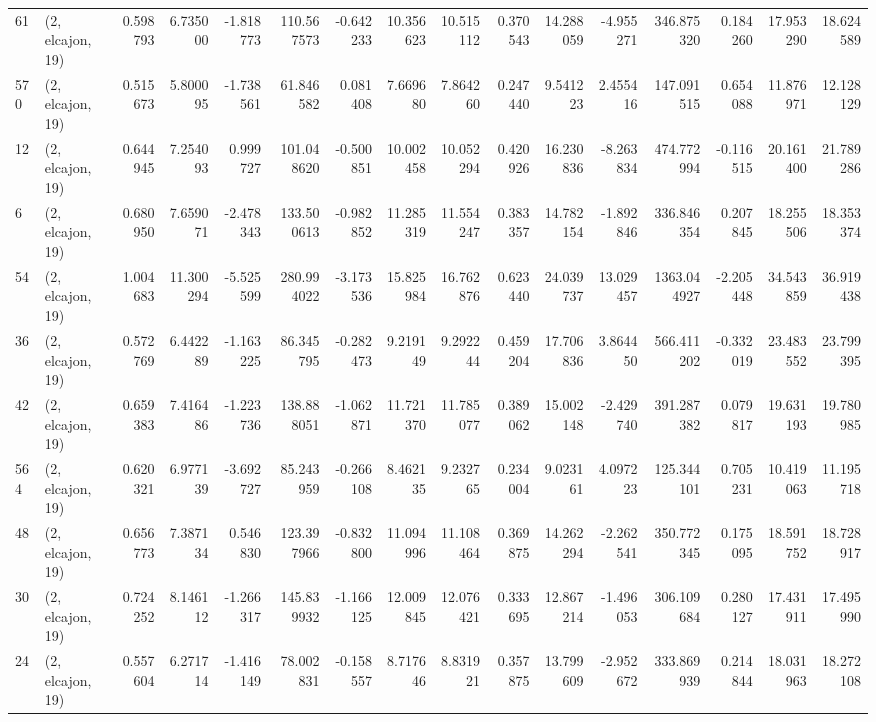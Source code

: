 \begin{tabular}{llrrrrrrrrrrrrrr}
61  &  (2, elcajon, 19) &   0.598793 &   6.735000 &  -1.818773 &   110.567573 &  -0.642233 &  10.356623 &  10.515112 &  0.370543 &  14.288059 &  -4.955271 &    346.875320 &   0.184260 &  17.953290 &   18.624589 \\
570 &  (2, elcajon, 19) &   0.515673 &   5.800095 &  -1.738561 &    61.846582 &   0.081408 &   7.669680 &   7.864260 &  0.247440 &   9.541223 &   2.455416 &    147.091515 &   0.654088 &  11.876971 &   12.128129 \\
12  &  (2, elcajon, 19) &   0.644945 &   7.254093 &   0.999727 &   101.048620 &  -0.500851 &  10.002458 &  10.052294 &  0.420926 &  16.230836 &  -8.263834 &    474.772994 &  -0.116515 &  20.161400 &   21.789286 \\
6   &  (2, elcajon, 19) &   0.680950 &   7.659071 &  -2.478343 &   133.500613 &  -0.982852 &  11.285319 &  11.554247 &  0.383357 &  14.782154 &  -1.892846 &    336.846354 &   0.207845 &  18.255506 &   18.353374 \\
54  &  (2, elcajon, 19) &   1.004683 &  11.300294 &  -5.525599 &   280.994022 &  -3.173536 &  15.825984 &  16.762876 &  0.623440 &  24.039737 &  13.029457 &   1363.044927 &  -2.205448 &  34.543859 &   36.919438 \\
36  &  (2, elcajon, 19) &   0.572769 &   6.442289 &  -1.163225 &    86.345795 &  -0.282473 &   9.219149 &   9.292244 &  0.459204 &  17.706836 &   3.864450 &    566.411202 &  -0.332019 &  23.483552 &   23.799395 \\
42  &  (2, elcajon, 19) &   0.659383 &   7.416486 &  -1.223736 &   138.888051 &  -1.062871 &  11.721370 &  11.785077 &  0.389062 &  15.002148 &  -2.429740 &    391.287382 &   0.079817 &  19.631193 &   19.780985 \\
564 &  (2, elcajon, 19) &   0.620321 &   6.977139 &  -3.692727 &    85.243959 &  -0.266108 &   8.462135 &   9.232765 &  0.234004 &   9.023161 &   4.097223 &    125.344101 &   0.705231 &  10.419063 &   11.195718 \\
48  &  (2, elcajon, 19) &   0.656773 &   7.387134 &   0.546830 &   123.397966 &  -0.832800 &  11.094996 &  11.108464 &  0.369875 &  14.262294 &  -2.262541 &    350.772345 &   0.175095 &  18.591752 &   18.728917 \\
30  &  (2, elcajon, 19) &   0.724252 &   8.146112 &  -1.266317 &   145.839932 &  -1.166125 &  12.009845 &  12.076421 &  0.333695 &  12.867214 &  -1.496053 &    306.109684 &   0.280127 &  17.431911 &   17.495990 \\
24  &  (2, elcajon, 19) &   0.557604 &   6.271714 &  -1.416149 &    78.002831 &  -0.158557 &   8.717646 &   8.831921 &  0.357875 &  13.799609 &  -2.952672 &    333.869939 &   0.214844 &  18.031963 &   18.272108 \\

\end{tabular}
